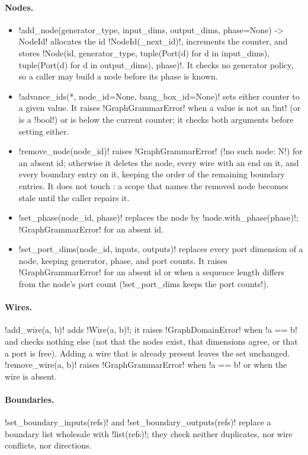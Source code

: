 \paragraph{Nodes.}
\begin{itemize}
\item \py!add_node(generator_type, input_dims, output_dims, phase=None) -> NodeId! allocates the id \py!NodeId(_next_id)!, increments the counter, and stores \py!Node(id, generator_type, tuple(Port(d) for d in input_dims), tuple(Port(d) for d in output_dims), phase)!. It checks no generator policy, so a caller may build a node before its phase is known.
\item \py!advance_ids(*, node_id=None, bang_box_id=None)! sets either counter to a given value. It raises \py!GraphGrammarError! when a value is not an \py!int! (or is a \py!bool!) or is below the current counter; it checks both arguments before setting either.
\item \py!remove_node(node_id)! raises \py!GraphGrammarError! (\code!no such node: N!) for an absent id; otherwise it deletes the node, every wire with an end on it, and every boundary entry on it, keeping the order of the remaining boundary entries. It does not touch \bboxes{}: a \bbox{} scope that names the removed node becomes stale until the caller repairs it.
\item \py!set_phase(node_id, phase)! replaces the node by \py!node.with_phase(phase)!; \py!GraphGrammarError! for an absent id.
\item \py!set_port_dims(node_id, inputs, outputs)! replaces every port dimension of a node, keeping generator, phase, and port counts. It raises \py!GraphGrammarError! for an absent id or when a sequence length differs from the node's port count (\code!set_port_dims keeps the port counts!).
\end{itemize}

\paragraph{Wires.} \py!add_wire(a, b)! adds \py!Wire(a, b)!; it raises \py!GraphDomainError! when \py!a == b! and checks nothing else (not that the nodes exist, that dimensions agree, or that a port is free). Adding a wire that is already present leaves the set unchanged. \py!remove_wire(a, b)! raises \py!GraphGrammarError! when \py!a == b! or when the wire is absent.

\paragraph{Boundaries.} \py!set_boundary_inputs(refs)! and \py!set_boundary_outputs(refs)! replace a boundary list wholesale with \py!list(refs)!; they check neither duplicates, nor wire conflicts, nor directions.

